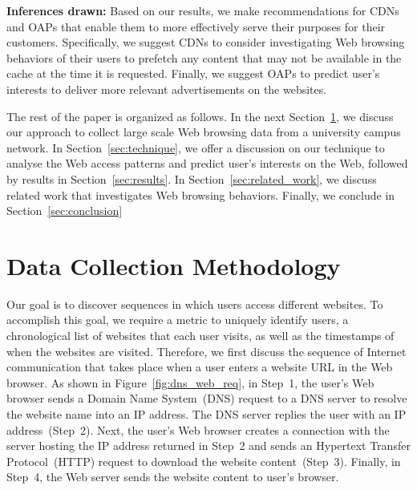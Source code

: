 \documentclass[letterpaper,twocolumn]{article}
\begin{document}
\vspace{-10pt}

\noindent
\textbf{Inferences drawn:} Based on our results, we make recommendations for CDNs and OAPs that enable them to more effectively serve their purposes for their customers.
Specifically, we suggest CDNs to consider investigating Web browsing behaviors of their users to prefetch any content that may not be available in the cache at the time it is requested.
Finally, we suggest OAPs to predict user's interests to deliver more relevant advertisements on the websites.

The rest of the paper is organized as follows.
In the next Section~\ref{sec:methodology}, we discuss our approach to collect large scale Web browsing data from a university campus network.
In Section~\ref{sec:technique}, we offer a discussion on our technique to analyse the Web access patterns and predict user's interests on the Web, followed by results in Section~\ref{sec:results}.
In Section~\ref{sec:related_work}, we discuss related work that investigates Web browsing behaviors.
Finally, we conclude in Section~\ref{sec:conclusion}



 
 

\vspace{-8pt}
\section{Data Collection Methodology}
\label{sec:methodology}
\vspace{-8pt}

Our goal is to discover sequences in which users access different websites. 
To accomplish this goal, we require a metric to uniquely identify users, a chronological list of websites that each user visits, as well as the timestamps of when the websites are visited. 
Therefore, we first discuss the sequence of Internet communication that takes place when a user enters a website URL in the Web browser.
As shown in Figure~\ref{fig:dns_web_req}, in Step~1, the user's Web browser sends a Domain Name System~(DNS) request to a DNS server to resolve the website name into an IP address.
The DNS server replies the user with an IP address~(Step~2).
Next, the user's Web browser creates a connection with the server hosting the IP address returned in Step~2 and sends an Hypertext Transfer Protocol~(HTTP) request to download the website content~(Step~3).
Finally, in Step~4, the Web server sends the website content to user's browser.
\end{document}
